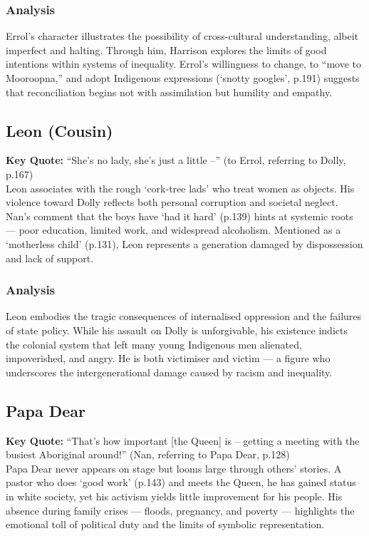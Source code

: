 \documentclass[a4paper]{article}
\begin{document}
\subsubsection{Analysis}
Errol’s character illustrates the possibility of cross-cultural understanding, albeit imperfect and halting. Through him, Harrison explores the limits of good intentions within systems of inequality. Errol’s willingness to change, to “move to Mooroopna,” and adopt Indigenous expressions (‘snotty googles’, p.191) suggests that reconciliation begins not with assimilation but humility and empathy.\\

\subsection{Leon (Cousin)}
\textbf{Key Quote:} ``She’s no lady, she’s just a little –'' (to Errol, referring to Dolly, p.167)\\

Leon associates with the rough ‘cork-tree lads’ who treat women as objects. His violence toward Dolly reflects both personal corruption and societal neglect. Nan’s comment that the boys have ‘had it hard’ (p.139) hints at systemic roots — poor education, limited work, and widespread alcoholism. Mentioned as a ‘motherless child’ (p.131), Leon represents a generation damaged by dispossession and lack of support.\\

\subsubsection{Analysis}
Leon embodies the tragic consequences of internalised oppression and the failures of state policy. While his assault on Dolly is unforgivable, his existence indicts the colonial system that left many young Indigenous men alienated, impoverished, and angry. He is both victimiser and victim — a figure who underscores the intergenerational damage caused by racism and inequality.\\

\subsection{Papa Dear}
\textbf{Key Quote:} ``That’s how important [the Queen] is – getting a meeting with the busiest Aboriginal around!'' (Nan, referring to Papa Dear, p.128)\\

Papa Dear never appears on stage but looms large through others’ stories. A pastor who does ‘good work’ (p.143) and meets the Queen, he has gained status in white society, yet his activism yields little improvement for his people. His absence during family crises — floods, pregnancy, and poverty — highlights the emotional toll of political duty and the limits of symbolic representation.\\
\end{document}
